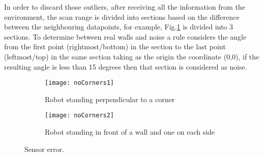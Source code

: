 In order to discard those outliers, after receiving all the information from the environment, the scan range is divided into sections based on the difference between the neighbouring datapoints, for example, Fig.\ref{fig:err2} is divided into 3 sections. To determine between real walls and noise a rule considers the angle from the first point (rightmost/bottom) in the section to the last point (leftmost/top) in the same section taking as the origin the coordinate (0,0), if the resulting angle is less than 15 degrees then that section is considered as noise. 

\begin{figure}[h]
\centering
	\begin{subfigure}{0.5\textwidth}
		\texttt{[image: noCorners1]}
		\caption{Robot standing perpendicular to a corner}
		\label{fig:err2}
	\end{subfigure}
	\begin{subfigure}{0.4\textwidth}
		\texttt{[image: noCorners2]}
		\caption{Robot standing in front of a wall and one on each side}
	\end{subfigure}
	\caption{Sensor error.}
	\label{fig:sensorerrors}
\end{figure}
\FloatBarrier
